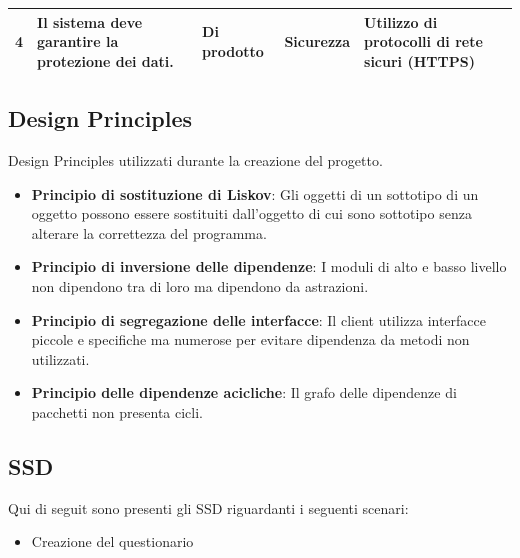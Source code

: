 \documentclass[12pt]{article}
\begin{document}
\begin{table}[H]
\begin{adjustbox}{max width=1.1\textwidth,center}
\begin{tabular}{lllll}
\multicolumn{1}{|l|}{4}                                                          & \multicolumn{1}{l|}{Il sistema deve garantire la protezione dei dati.}                   & \multicolumn{1}{l|}{Di prodotto}                                                  & \multicolumn{1}{l|}{Sicurezza}                                                      & \multicolumn{1}{l|}{Utilizzo di protocolli di rete sicuri (HTTPS)}                     \\ \hline
\end{tabular}
\endgroup
\end{adjustbox}
\end{table}


\subsection{Design Principles}
Design Principles utilizzati durante la creazione del progetto.
\begin{itemize}
	\item \textbf{Principio di sostituzione di Liskov}: Gli oggetti di un sottotipo di un oggetto possono essere sostituiti dall'oggetto di cui sono sottotipo senza alterare la correttezza del programma.
	\item \textbf{Principio di inversione delle dipendenze}: I moduli di alto e basso livello non dipendono tra di loro ma dipendono da astrazioni.
	\item \textbf{Principio di segregazione delle interfacce}: Il client utilizza interfacce piccole e specifiche ma numerose per evitare dipendenza da metodi non utilizzati.
	\item \textbf{Principio delle dipendenze acicliche}: Il grafo delle dipendenze di pacchetti non presenta cicli.
\end{itemize}

\subsection{SSD}
Qui di seguit sono presenti gli SSD riguardanti i seguenti scenari:
\begin{itemize}
\item Creazione del questionario
\end{itemize}
\end{document}
